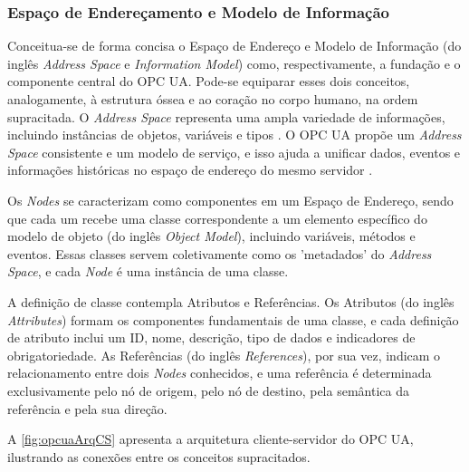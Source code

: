     \subsubsection{Espaço de Endereçamento e Modelo de Informação}

        Conceitua-se de forma concisa o Espaço de Endereço e Modelo de Informação (do inglês \textit{Address Space} e \textit{Information Model}) como, respectivamente, a fundação e o componente central do OPC UA. Pode-se equiparar esses dois conceitos, analogamente, à estrutura óssea e ao coração no corpo humano, na ordem supracitada. O \textit{Address Space} representa uma ampla variedade de informações, incluindo instâncias de objetos, variáveis e tipos \cite{gong2020}. O OPC UA propõe um \textit{Address Space} consistente e um modelo de serviço, e isso ajuda a unificar dados, eventos e informações históricas no espaço de endereço do mesmo servidor \cite{ren2019}.

        Os \textit{Nodes} se caracterizam como componentes em um Espaço de Endereço, sendo que cada um recebe uma classe correspondente a um elemento específico do modelo de objeto (do inglês \textit{Object Model}), incluindo variáveis, métodos e eventos. Essas classes servem coletivamente como os 'metadados' do \textit{Address Space}, e cada \textit{Node} é uma instância de uma classe.
        
        A definição de classe contempla Atributos e Referências. Os Atributos (do inglês \textit{Attributes}) formam os componentes fundamentais de uma classe, e cada definição de atributo inclui um ID, nome, descrição, tipo de dados e indicadores de obrigatoriedade. As Referências (do inglês \textit{References}), por sua vez, indicam o relacionamento entre dois \textit{Nodes} conhecidos, e uma referência é determinada exclusivamente pelo nó de origem, pelo nó de destino, pela semântica da referência e pela sua direção.
        
        A \autoref{fig:opcuaArqCS} apresenta a arquitetura cliente-servidor do OPC UA, ilustrando as conexões entre os conceitos supracitados.

